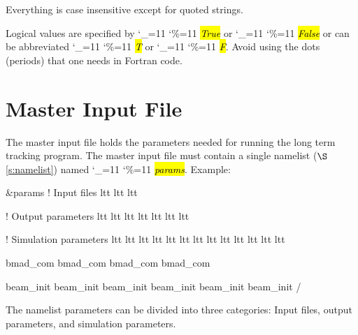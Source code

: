 \documentclass{hitec}
\newcommand\dottcmd[1]{\hl{\em#1}\endgroup}
\newcommand{\vn}{\begingroup\catcode`\_=11 \catcode`\%=11 \dottcmd}
\newcommand{\sref}[1]{$\S$\ref{#1}}
\newcommand{\Section}[1]{\section{#1}\vspace*{-1ex}}
\begin{document}
{{{{{{{{{{{{{{{{{Everything is case insensitive except for quoted strings.

Logical values are specified by \vn{True} or \vn{False} or can be
abbreviated \vn{T} or \vn{F}. Avoid using the dots (periods) that one
needs in Fortran code.

\newpage

\Section{Master Input File}
\label{s:input}

The master input file holds the parameters needed for running the long term tracking program. The
master input file must contain a single namelist (\sref{s:namelist}) named \vn{params}.  Example:
\begin{code}
&params
  ! Input files
  ltt%
  ltt%
  ltt%

  ! Output parameters
  ltt%
  ltt%
  ltt%
  ltt%
  ltt%
  ltt%
  ltt%

  ! Simulation parameters
  ltt%
  ltt%
  ltt%
  ltt%
  ltt%
  ltt%
  ltt%
  ltt%
  ltt%
  ltt%
  ltt%
  ltt%
  ltt%

  bmad_com%
  bmad_com%
  bmad_com%
  bmad_com%

  beam_init%
  beam_init%
  beam_init%
  beam_init%
  beam_init%
  beam_init%
/
\end{code}

\newpage

The namelist parameters can be divided into three categories: Input files, output parameters, and
simulation parameters.

}}}}}}}}}}}}}}}}}
\end{document}

